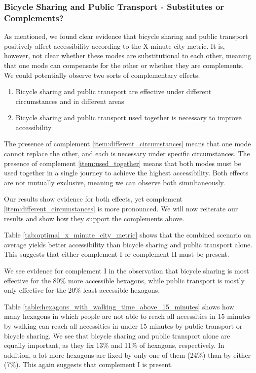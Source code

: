 \subsubsection{Bicycle Sharing and Public Transport - Substitutes or Complements?}
As mentioned, we found clear evidence that bicycle sharing and public transport positively affect accessibility according to the X-minute city metric.
It is, however, not clear whether these modes are substitutional to each other, meaning that one mode can compensate for the other or whether they are complements.
We could potentially observe two sorts of complementary effects.
\begin{enumerate}
  \renewcommand{\labelenumi}{Complement \theenumi.}
  \item Bicycle sharing and public transport are effective under different circumstances and in different areas \label{item:different_circumstances}
  \item Bicycle sharing and public transport used together is necessary to improve accessibility \label{item:used_together}
\end{enumerate}
The presence of complement \ref{item:different_circumstances} means that one mode cannot replace the other, and each is necessary under specific circumstances.
The presence of complement \ref{item:used_together} means that both modes must be used together in a single journey to achieve the highest accessibility.
Both effects are not mutually exclusive, meaning we can observe both simultaneously.

Our results show evidence for both effects, yet complement \ref{item:different_circumstances} is more pronounced.
We will now reiterate our results and show how they support the complements above.

Table \ref{tab:optimal_x_minute_city_metric} shows that the combined scenario on average yields better accessibility than bicycle sharing and public transport alone.
This suggests that either complement I or complement II must be present.

We see evidence for complement I in the observation that bicycle sharing is most effective for the 80\% more accessible hexagons, while public transport is mostly only effective for the 20\% least accessible hexagons.

Table \ref{table:hexagons_with_walking_time_above_15_minutes} shows how many hexagons in which people are not able to reach all necessities in 15 minutes by walking can reach all necessities in under 15 minutes by public transport or bicycle sharing.
We see that bicycle sharing and public transport alone are equally important, as they fix 13\% and 11\% of hexagons, respectively.
In addition, a lot more hexagons are fixed by only one of them (24\%) than by either (7\%).
This again suggests that complement I is present.

